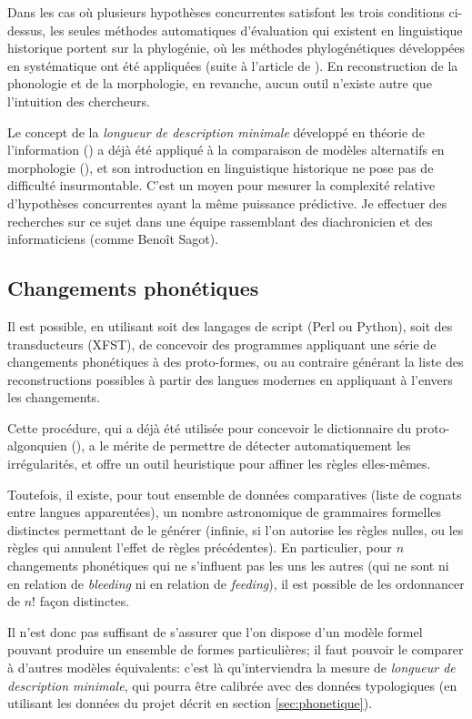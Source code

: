 \documentclass[oldfontcommands,oneside,a4paper,11pt]{article}
\begin{document}
Dans les cas où plusieurs hypothèses concurrentes satisfont les trois conditions ci-dessus, les seules méthodes automatiques d'évaluation qui existent en linguistique historique portent sur la phylogénie, où les méthodes phylogénétiques développées en systématique ont été appliquées (suite à l'article de \citealt{gray03ie}). En reconstruction de la phonologie et de la morphologie, en revanche, aucun outil n'existe autre que l'intuition des chercheurs. 

Le concept de la \textit{longueur de description minimale} développé en théorie de l'information (\citealt{rissanen84}) a déjà été appliqué à la comparaison de modèles alternatifs en morphologie (\citealt{walther14compactness}), et son introduction en linguistique historique ne pose pas de difficulté insurmontable. C'est un moyen pour mesurer la complexité relative d'hypothèses concurrentes ayant la même puissance prédictive. Je effectuer des recherches sur ce sujet dans une équipe rassemblant des diachronicien et des informaticiens (comme Benoît Sagot).


\subsection{Changements phonétiques}
Il est possible, en utilisant soit des langages de script (Perl ou Python), soit des transducteurs (XFST), de concevoir des programmes appliquant une série de changements phonétiques à des proto-formes, ou au contraire générant la liste des reconstructions possibles à partir des langues modernes en appliquant à l'envers les changements.

Cette procédure, qui a déjà été utilisée pour concevoir le dictionnaire du proto-algonquien (\citealt{hewson93proto}), a le mérite de permettre de détecter automatiquement les irrégularités, et offre un outil heuristique pour affiner les règles elles-mêmes.

Toutefois, il existe, pour tout ensemble de données comparatives (liste de cognats entre langues apparentées), un nombre astronomique de grammaires formelles distinctes permettant de le générer (infinie, si l'on autorise les règles nulles, ou les règles qui annulent l'effet de règles précédentes). En particulier, pour $n$ changements phonétiques qui ne s'influent pas les uns les autres (qui ne sont ni en relation de \textit{bleeding} ni en relation de \textit{feeding}), il est possible de les ordonnancer de $n!$ façon distinctes.

Il n'est donc pas suffisant de s'assurer que l'on dispose d'un modèle formel pouvant produire un ensemble de formes particulières; il faut pouvoir le comparer à d'autres modèles équivalents: c'est là qu'interviendra la mesure de \textit{longueur de description minimale}, qui pourra être calibrée avec des données typologiques (en utilisant les données du projet décrit en section \ref{sec:phonetique}).
\end{document}
